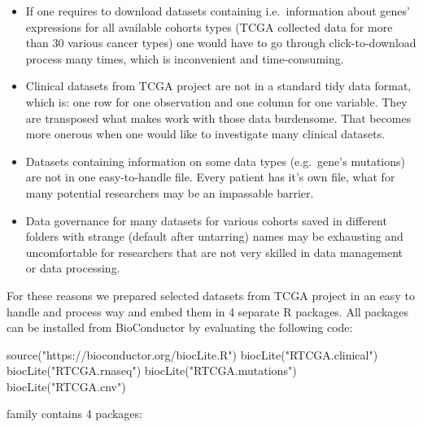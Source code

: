 \begin{itemize}
\itemsep1pt\parskip0pt
\item
  If one requires to download datasets containing i.e.~information about
  genes' expressions for all available cohorts types (TCGA collected
  data for more than 30 various cancer types) one would have to go
  through click-to-download process many times, which is inconvenient
  and time-consuming.
\item
  Clinical datasets from TCGA project are not in a standard tidy data
  format, which is: one row for one observation and one column for one
  variable. They are transposed what makes work with those data
  burdensome. That becomes more onerous when one would like to
  investigate many clinical datasets.
\item
  Datasets containing information on some data types (e.g.~gene's
  mutations) are not in one easy-to-handle file. Every patient has it's
  own file, what for many potential researchers may be an impassable
  barrier.
\item
  Data governance for many datasets for various cohorts saved in
  different folders with strange (default after untarring) names may be
  exhausting and uncomfortable for researchers that are not very skilled
  in data management or data processing.
\end{itemize}

For these reasons we prepared selected datasets from TCGA project in an
easy to handle and process way and embed them in 4 separate R packages.
All packages can be installed from BioConductor by evaluating the
following code:

\begin{Schunk}
\begin{Sinput}
source("https://bioconductor.org/biocLite.R")
biocLite("RTCGA.clinical") 
biocLite("RTCGA.rnaseq") 
biocLite("RTCGA.mutations") 
biocLite("RTCGA.cnv") 
\end{Sinput}
\end{Schunk}

 family contains 4 packages:

